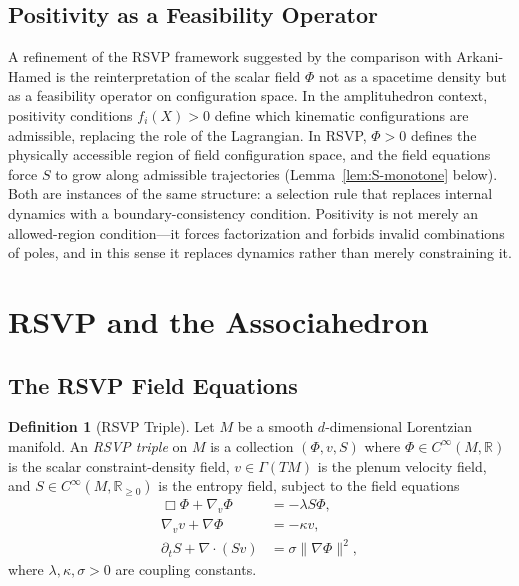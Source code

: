 \documentclass[12pt, oneside]{amsart}
\theoremstyle{plain}
\theoremstyle{definition}
\newtheorem{definition}[theorem]{Definition}
\theoremstyle{remark}
\newcommand{\R}{\mathbb{R}}
\newcommand{\Phif}{\Phi}
\newcommand{\vf}{v}
\newcommand{\Sf}{S}
\begin{document}
\subsection{Positivity as a Feasibility Operator}

A refinement of the RSVP framework suggested by the comparison with Arkani-Hamed is the reinterpretation of the scalar field $\Phif$ not as a spacetime density but as a feasibility operator on configuration space. In the amplituhedron context, positivity conditions $f_i(X) > 0$ define which kinematic configurations are admissible, replacing the role of the Lagrangian. In RSVP, $\Phif > 0$ defines the physically accessible region of field configuration space, and the field equations force $\Sf$ to grow along admissible trajectories (Lemma~\ref{lem:S-monotone} below). Both are instances of the same structure: a selection rule that replaces internal dynamics with a boundary-consistency condition. Positivity is not merely an allowed-region condition---it forces factorization and forbids invalid combinations of poles, and in this sense it replaces dynamics rather than merely constraining it.

\section{RSVP and the Associahedron}
\label{sec:rsvp}

\subsection{The RSVP Field Equations}

\begin{definition}[RSVP Triple]
Let $M$ be a smooth $d$-dimensional Lorentzian manifold. An \emph{RSVP triple} on $M$ is a collection $(\Phif, \vf, \Sf)$ where $\Phif \in C^\infty(M, \R)$ is the scalar constraint-density field, $\vf \in \Gamma(TM)$ is the plenum velocity field, and $\Sf \in C^\infty(M, \R_{\geq 0})$ is the entropy field, subject to the field equations
\begin{align}
  \Box \Phif + \nabla_\vf \Phif &= -\lambda \Sf \Phif, \label{eq:phi}\\
  \nabla_\vf \vf + \nabla \Phif &= -\kappa \vf, \label{eq:v}\\
  \partial_t \Sf + \nabla \cdot (\Sf \vf) &= \sigma \|\nabla \Phif\|^2, \label{eq:S}
\end{align}
where $\lambda, \kappa, \sigma > 0$ are coupling constants.
\end{definition}
\end{document}
